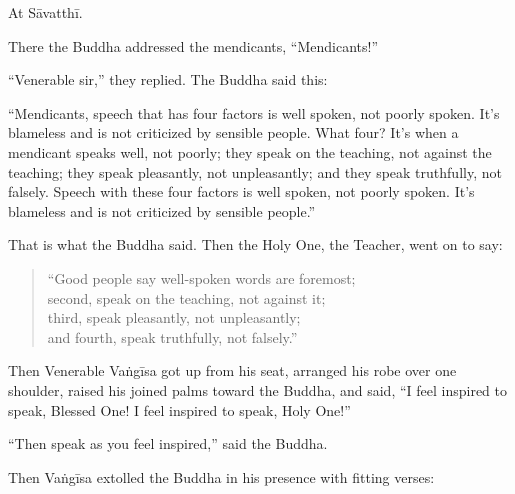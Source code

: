 \documentclass[12pt,openany]{book}%
\begin{document}
At \textsanskrit{Sāvatthī}. 

There the Buddha addressed the mendicants, “Mendicants!” 

“Venerable sir,” they replied. The Buddha said this: 

“Mendicants, speech that has four factors is well spoken, not poorly spoken. It’s blameless and is not criticized by sensible people. What four? It’s when a mendicant speaks well, not poorly; they speak on the teaching, not against the teaching; they speak pleasantly, not unpleasantly; and they speak truthfully, not falsely. Speech with these four factors is well spoken, not poorly spoken. It’s blameless and is not criticized by sensible people.” 

That is what the Buddha said. Then the Holy One, the Teacher, went on to say: 

\begin{verse}%
“Good people say well-spoken words are foremost; \\
second, speak on the teaching, not against it; \\
third, speak pleasantly, not unpleasantly; \\
and fourth, speak truthfully, not falsely.” 

%
\end{verse}

Then Venerable \textsanskrit{Vaṅgīsa} got up from his seat, arranged his robe over one shoulder, raised his joined palms toward the Buddha, and said, “I feel inspired to speak, Blessed One! I feel inspired to speak, Holy One!” 

“Then speak as you feel inspired,” said the Buddha. 

Then \textsanskrit{Vaṅgīsa} extolled the Buddha in his presence with fitting verses: 
\end{document}
